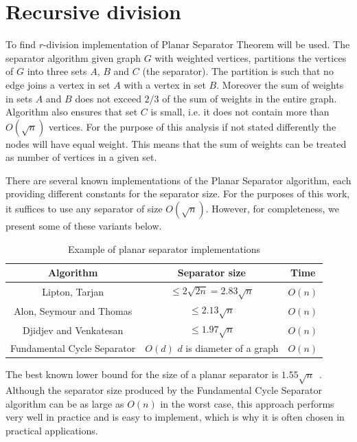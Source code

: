 \section{Recursive division}
To find $r$-division implementation of Planar Separator Theorem \cite{separatorT} will be used. The separator algorithm given graph $G$ with weighted vertices, partitions the vertices of $G$ into three sets $A$, $B$ and $C$ (the separator). The partition is such that no edge joins a vertex in set $A$ with a vertex in set $B$. Moreover the sum of weights in sets $A$ and $B$ does not exceed $2/3$ of the sum of weights in the entire graph. Algorithm also ensures that set $C$ is small, i.e. it does not contain more than $O(\sqrt{n})$ vertices. For the purpose of this analysis if not stated differently the nodes will have equal weight. This means that the sum of weights can be treated as number of vertices in a given set.

There are several known implementations of the Planar Separator algorithm, each providing different constants for the separator size. For the purposes of this work, it suffices to use any separator of size $O(\sqrt{n})$. However, for completeness, we present some of these variants below.

\begin{table}[h!]
\centering
\begin{tabular}{|c|c|c|}
\hline
Algorithm & Separator size & Time \\
\hline
Lipton, Tarjan \cite{separatorT} & $\leq 2\sqrt{2n} = 2.83 \sqrt{n}$ & $O(n)$\\
\hline
Alon, Seymour and Thomas \cite{secondBestSeparator} &  $ \leq 2.13\sqrt{n}$ & $O(n)$ \\
\hline
Djidjev and Venkatesan \cite{Djiev} & $ \leq 1.97\sqrt{n}$ & $O(n)$ \\
\hline
Fundamental Cycle Separator \cite{separatoPrzeglad} & $O(d)$ $d$ is diameter of a graph & $O(n)$\\
\hline
\end{tabular}
\caption{Example of planar separator implementations}
\label{tab:przyklad}
\end{table}

The best known lower bound for the size of a planar separator is $1.55\sqrt{n}$~\cite{separatorBound}. Although the separator size produced by the Fundamental Cycle Separator algorithm can be as large as $O(n)$ in the worst case, this approach performs very well in practice and is easy to implement, which is why it is often chosen in practical applications.


